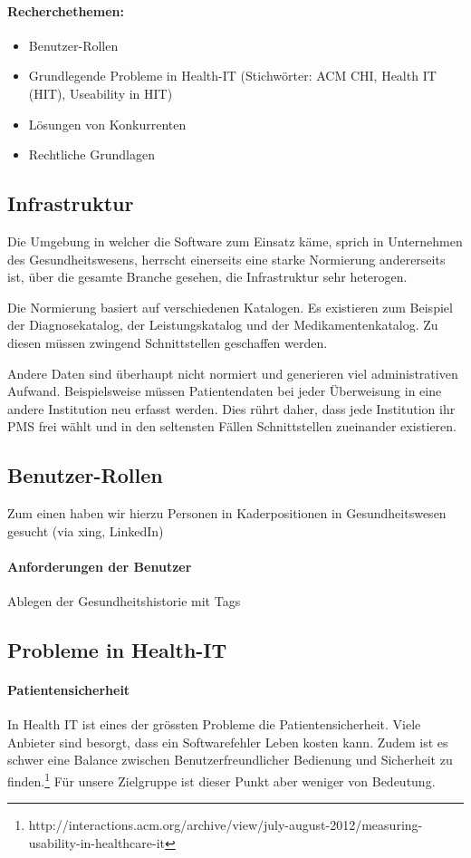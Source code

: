 \documentclass[a4paper]{scrreprt}
\begin{document}
\paragraph{Recherchethemen:} 
\begin{itemize}
\item Benutzer-Rollen
\item Grundlegende Probleme in Health-IT (Stichwörter: ACM CHI, Health IT (HIT), Useability in HIT)
\item Lösungen von Konkurrenten
\item Rechtliche Grundlagen
\end{itemize}

\subsection{Infrastruktur}
Die Umgebung in welcher die Software zum Einsatz käme, sprich in Unternehmen des Gesundheitswesens,
herrscht einerseits eine starke Normierung andererseits ist, über die gesamte Branche gesehen, die
Infrastruktur sehr heterogen.

Die Normierung basiert auf verschiedenen Katalogen. Es existieren zum Beispiel der Diagnosekatalog,
der Leistungskatalog und der Medikamentenkatalog. Zu diesen müssen zwingend Schnittstellen
geschaffen werden.

Andere Daten sind überhaupt nicht normiert und generieren viel administrativen Aufwand. Beispielsweise
müssen Patientendaten bei jeder Überweisung in eine andere Institution neu erfasst werden. Dies rührt
daher, dass jede Institution ihr PMS frei wählt und in den seltensten Fällen Schnittstellen
zueinander existieren.

\subsection{Benutzer-Rollen}
Zum einen haben wir hierzu Personen in Kaderpositionen in Gesundheitswesen gesucht (via xing, LinkedIn) 


\paragraph{Anforderungen der Benutzer}
Ablegen der Gesundheitshistorie mit Tags


\subsection{Probleme in Health-IT}
\paragraph{Patientensicherheit} In Health IT ist eines der grössten Probleme die Patientensicherheit. Viele Anbieter sind besorgt, dass ein Softwarefehler Leben kosten kann. Zudem ist es schwer eine Balance zwischen Benutzerfreundlicher Bedienung und Sicherheit zu finden.\footnote{http://interactions.acm.org/archive/view/july-august-2012/measuring-usability-in-healthcare-it}
Für unsere Zielgruppe ist dieser Punkt aber weniger von Bedeutung.
\end{document}
